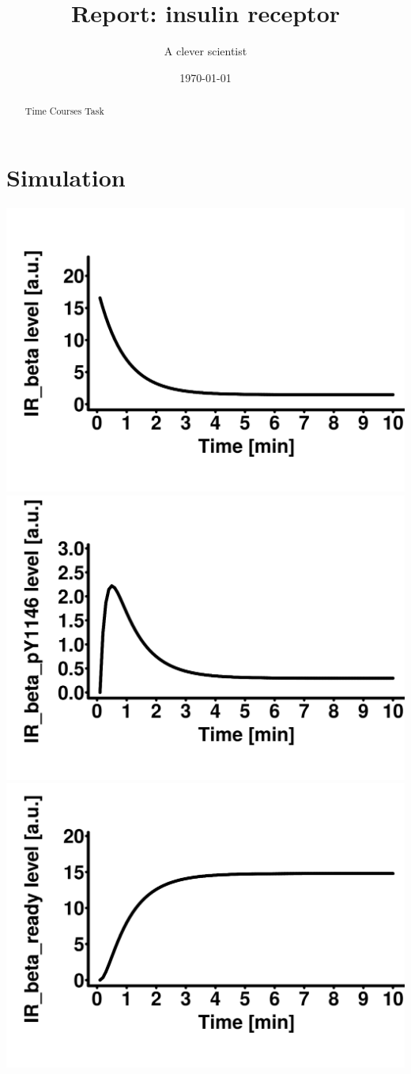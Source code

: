 \documentclass[10pt,a4paper]{article}
\author{A clever scientist}
\title{Report: insulin receptor}
\date{\today}
\begin{document}
\maketitle
\begin{abstract}
Time Courses Task\end{abstract}
\tableofcontents
\section{Simulation}
\includegraphics[scale=0.08]{plots_det_tc_mean/insulin_receptor_sd_n_ci95_IR_beta.png}
\hfill
\includegraphics[scale=0.08]{plots_det_tc_mean/insulin_receptor_sd_n_ci95_IR_beta_pY1146.png}
\hfill
\includegraphics[scale=0.08]{plots_det_tc_mean/insulin_receptor_sd_n_ci95_IR_beta_ready.png}
\hfill
\end{document}

